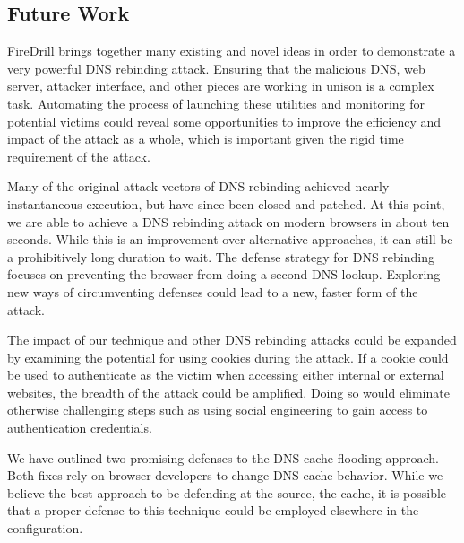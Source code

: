 \subsection{Future Work}

FireDrill brings together many existing and novel ideas in order to demonstrate a very powerful DNS rebinding attack.
Ensuring that the malicious DNS, web server, attacker interface, and other pieces are working in unison is a complex task. 
Automating the process of launching these utilities and monitoring for potential victims could reveal some opportunities to improve the efficiency and impact of the attack as a whole, which is important given the rigid time requirement of the attack.

Many of the original attack vectors of DNS rebinding achieved nearly instantaneous execution, but have since been closed and patched.
At this point, we are able to achieve a DNS rebinding attack on modern browsers in about ten seconds. While this is an improvement over alternative approaches, it can still be a prohibitively long duration to wait.
The defense strategy for DNS rebinding focuses on preventing the browser from doing a second DNS lookup. 
Exploring new ways of circumventing defenses could lead to a new, faster form of the attack.

The impact of our technique and other DNS rebinding attacks could be expanded by examining the potential for using cookies during the attack.
If a cookie could be used to authenticate as the victim when accessing either internal or external websites, the breadth of the attack could be amplified. 
Doing so would eliminate otherwise challenging steps such as using social engineering to gain access to authentication credentials.

We have outlined two promising defenses to the DNS cache flooding approach. 
Both fixes rely on browser developers to change DNS cache behavior. 
While we believe the best approach to be defending at the source, the cache, it is possible that a proper defense to this technique could be employed elsewhere in the configuration.




